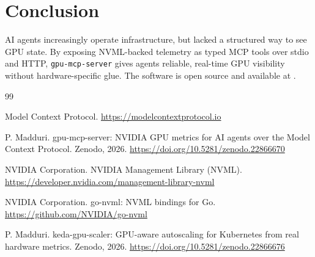 \documentclass[11pt]{article}
\begin{document}
\section{Conclusion}

AI agents increasingly operate infrastructure, but lacked a structured way to see
GPU state. By exposing NVML-backed telemetry as typed MCP tools over stdio and
HTTP, \texttt{gpu-mcp-server} gives agents reliable, real-time GPU visibility
without hardware-specific glue. The software is open source and available at
\cite{gms}.

\begin{thebibliography}{99}

 Model Context Protocol. \url{https://modelcontextprotocol.io}

 P. Madduri. gpu-mcp-server: NVIDIA GPU metrics for AI agents over
the Model Context Protocol. Zenodo, 2026.
\url{https://doi.org/10.5281/zenodo.22866670}

 NVIDIA Corporation. NVIDIA Management Library (NVML).
\url{https://developer.nvidia.com/management-library-nvml}

 NVIDIA Corporation. go-nvml: NVML bindings for Go.
\url{https://github.com/NVIDIA/go-nvml}

 P. Madduri. keda-gpu-scaler: GPU-aware autoscaling for Kubernetes
from real hardware metrics. Zenodo, 2026.
\url{https://doi.org/10.5281/zenodo.22866676}

\end{thebibliography}
\end{document}
